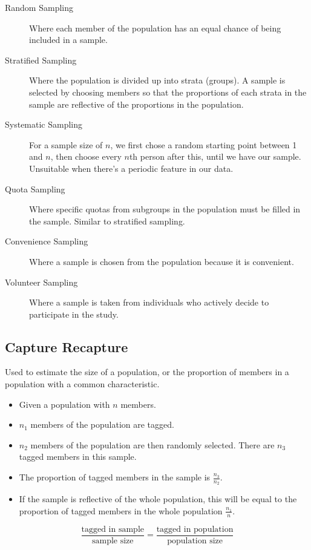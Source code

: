 \documentclass[a4paper,11pt]{article}
\begin{document}
\begin{description}
\item [Random Sampling] Where each member of the population has an equal chance
	of being included in a sample.
\item [Stratified Sampling] Where the population is divided up into strata
	(groups). A sample is selected by choosing members so that the proportions
	of each strata in the sample are reflective of the proportions in the
	population.
\item [Systematic Sampling] For a sample size of $n$, we first chose a random
	starting point between 1 and $n$, then choose every $n$th person after this,
	until we have our sample. Unsuitable when there's a periodic feature in our
	data.
\item [Quota Sampling] Where specific quotas from subgroups in the population
	must be filled in the sample. Similar to stratified sampling.
\item [Convenience Sampling] Where a sample is chosen from the population
	because it is convenient.
\item [Volunteer Sampling] Where a sample is taken from individuals who actively
	decide to participate in the study.
\end{description}

\subsection{Capture Recapture}

Used to estimate the size of a population, or the proportion of members in a
population with a common characteristic.

\begin{itemize}
\item Given a population with $n$ members.
\item $n_1$ members of the population are tagged.
\item $n_2$ members of the population are then randomly selected. There are
	$n_3$ tagged members in this sample.
\item The proportion of tagged members in the sample is $\frac{n_3}{n_2}$.
\item If the sample is reflective of the whole population, this will be equal
	to the proportion of tagged members in the whole population $\frac{n_1}{n}$.
\end{itemize}

$$
\frac{\text{tagged in sample}}{\text{sample size}} = \frac{\text{tagged in population}}{\text{population size}}
$$
\end{document}
